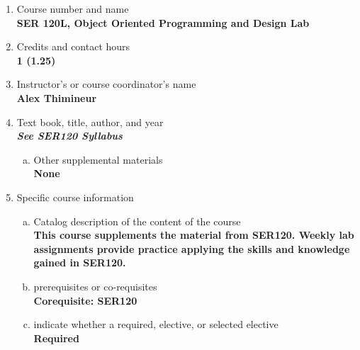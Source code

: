 \label{SER120L}  %
\begin{enumerate}[1.]
\item Course number and name\\
  {\bfseries
SER 120L, Object Oriented Programming and Design Lab
  }

\item Credits and contact hours\\
  {\bfseries
1 (1.25)
  }

\item Instructor's or course coordinator's name\\
  {\bfseries
Alex Thimineur
  }

\item Text book, title, author, and year\\
  {\bfseries
    \emph{See SER120 Syllabus}
  }
\begin{enumerate}[a.]
\item Other supplemental materials\\
  {\bfseries
    None
  }
\end{enumerate}

\item Specific course information
\begin{enumerate}[a.]
\item Catalog description of the content of the course\\
  {\bfseries
This course supplements the material from SER120. Weekly lab assignments provide practice applying
the skills and knowledge gained in SER120.
  }

\item prerequisites or co-requisites\\
  {\bfseries
    Corequisite: SER120
  }

\item indicate whether a required, elective, or selected elective\\ %
  {\bfseries
    Required
  }


\end{enumerate}
\end{enumerate}
